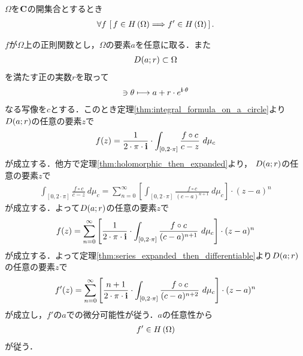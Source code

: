 	\begin{screen}
		\begin{thm}[正則関数の導関数も正則]\label{thm:derivative_of_holomorphic_function_is_holomorphic}
			$\Omega$を$\mathbf{C}$の開集合とするとき
			\begin{align}
				\forall f\, \left[\, f \in H\left(\Omega\right) \Longrightarrow f' \in H\left(\Omega\right)\, \right].
			\end{align}
		\end{thm}
	\end{screen}
	
	\begin{sketch}
		$f$が$\Omega$上の正則関数とし，$\Omega$の要素$a$を任意に取る．また
		\begin{align}
			D(a;r) \subset \Omega
		\end{align}
		を満たす正の実数$r$を取って
		\begin{align}
			[0,2\cdot\pi] \ni \theta \longmapsto a + r \cdot e^{\isym \cdot \theta}
		\end{align}
		なる写像を$c$とする．このとき定理\ref{thm:integral_formula_on_a_circle}より
		$D(a;r)$の任意の要素$z$で
		\begin{align}
			f(z) = \frac{1}{2\cdot\pi\cdot\mathbf{i}} \cdot \int_{[0,2\cdot\pi]} \frac{f \circ c}{c - z}\ d\mu_{c}
		\end{align}
		が成立する．他方で定理\ref{thm:holomorphic_then_expanded}より，
		$D(a;r)$の任意の要素$z$で
		\begin{align}
			\int_{[0,2\cdot\pi]} \frac{f \circ c}{c - z}\ d\mu_{c}
			= \sum_{n=0}^{\infty} \left[ \int_{[0,2\cdot\pi]} \frac{f \circ c}{(c - a)^{n+1}}\ d\mu_{c} \right] \cdot (z-a)^{n}
		\end{align}
		が成立する．よって$D(a;r)$の任意の要素$z$で
		\begin{align}
			f(z) = \sum_{n=0}^{\infty} \left[ \frac{1}{2\cdot\pi\cdot\mathbf{i}} \cdot \int_{[0,2\cdot\pi]} \frac{f \circ c}{(c - a)^{n+1}}\ d\mu_{c} \right] \cdot (z-a)^{n}
		\end{align}
		が成立する．よって定理\ref{thm:series_expanded_then_differentiable}より$D(a;r)$の任意の要素$z$で
		\begin{align}
			f'(z) = \sum_{n=0}^{\infty} \left[ \frac{n+1}{2\cdot\pi\cdot\mathbf{i}} \cdot \int_{[0,2\cdot\pi]} \frac{f \circ c}{(c - a)^{n+2}}\ d\mu_{c} \right] \cdot (z-a)^{n}
		\end{align}
		が成立し，$f'$の$a$での微分可能性が従う．$a$の任意性から
		\begin{align}
			f' \in H\left(\Omega\right)
		\end{align}
		が従う．
		\QED
	\end{sketch}
	
